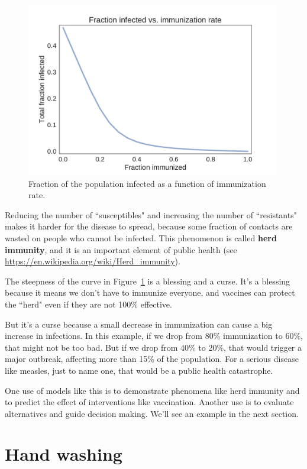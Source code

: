 \documentclass[12pt]{book}
\theoremstyle{exercise}
\begin{document}
\begin{figure}
\centerline{\includegraphics[height=3in]{figs/chap05-fig03.pdf}}
\caption{Fraction of the population infected as a function of immunization rate.}
\label{chap05-fig03}
\end{figure} 

Reducing the number of ``susceptibles" and increasing the number of ``resistants" makes it harder for the disease to spread, because some fraction of contacts are wasted on people who cannot be infected.  This phenomenon is called {\bf herd immunity}, and it is an important element of public health (see \url{https://en.wikipedia.org/wiki/Herd_immunity}).

The steepness of the curve in Figure~\ref{chap05-fig03} is a blessing and a curse.  It's a blessing because it means we don't have to immunize everyone, and vaccines can protect the ``herd" even if they are not 100\% effective.

But it's a curse because a small decrease in immunization can cause a big increase in infections.  In this example, if we drop from 80\% immunization to 60\%, that might not be too bad.  But if we drop from 40\% to 20\%, that would trigger a major outbreak, affecting more than 15\% of the population.  For a serious disease like measles, just to name one, that would be a public health catastrophe.

One use of models like this is to demonstrate phenomena like herd immunity and to predict the effect of interventions like vaccination.  Another use is to evaluate alternatives and guide decision making.  We'll see an example in the next section.


\section{Hand washing}
\end{document}

